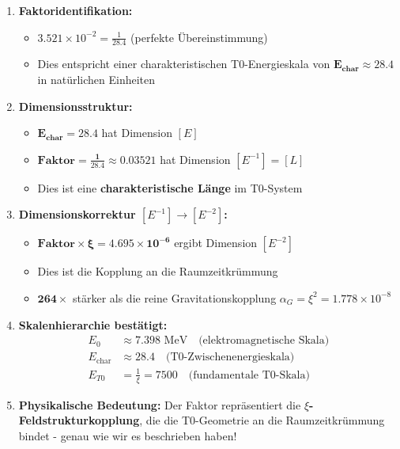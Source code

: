 	\begin{enumerate}
		\item \textbf{Faktoridentifikation:}
		\begin{itemize}
			\item $3.521 \times 10^{-2} = \frac{1}{28.4}$ (perfekte Übereinstimmung)
			\item Dies entspricht einer charakteristischen T0-Energieskala von $\mathbf{E_{\text{char}} \approx 28.4}$ in natürlichen Einheiten
		\end{itemize}
		
		\item \textbf{Dimensionsstruktur:}
		\begin{itemize}
			\item $\mathbf{E_{\text{char}} = 28.4}$ hat Dimension $[E]$
			\item $\mathbf{\text{Faktor} = \frac{1}{28.4} \approx 0.03521}$ hat Dimension $[E^{-1}] = [L]$
			\item Dies ist eine \textbf{charakteristische Länge} im T0-System
		\end{itemize}
		
		\item \textbf{Dimensionskorrektur $[E^{-1}] \rightarrow [E^{-2}]$:}
		\begin{itemize}
			\item $\mathbf{\text{Faktor} \times \xi = 4.695 \times 10^{-6}}$ ergibt Dimension $[E^{-2}]$
			\item Dies ist die Kopplung an die Raumzeitkrümmung
			\item $\mathbf{264\times}$ stärker als die reine Gravitationskopplung $\alpha_G = \xi^2 = 1.778 \times 10^{-8}$
		\end{itemize}
		
		\item \textbf{Skalenhierarchie bestätigt:}
		\begin{align}
			E_0 &\approx 7.398 \text{ MeV} \quad \text{(elektromagnetische Skala)} \\
			E_{\text{char}} &\approx 28.4 \quad \text{(T0-Zwischenenergieskala)} \\
			E_{T0} &= \frac{1}{\xi} = 7500 \quad \text{(fundamentale T0-Skala)}
		\end{align}
		
		\item \textbf{Physikalische Bedeutung:}
		Der Faktor repräsentiert die \textbf{$\xi$-Feldstrukturkopplung}, die die T0-Geometrie an die Raumzeitkrümmung bindet - genau wie wir es beschrieben haben!
	\end{enumerate}
	
